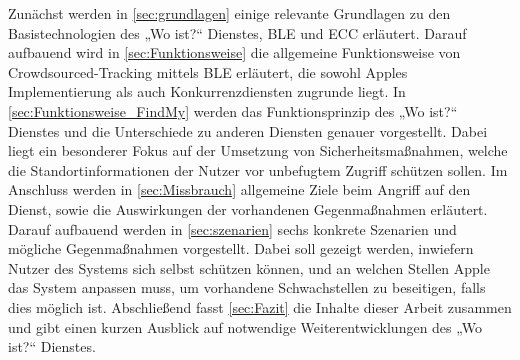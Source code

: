 Zunächst werden in \autoref{sec:grundlagen} einige relevante Grundlagen zu den Basistechnologien des „Wo ist?“ Dienstes, \ac{BLE} und \ac{ECC} erläutert.
Darauf aufbauend wird in \autoref{sec:Funktionsweise} die allgemeine Funktionsweise von Crowdsourced-Tracking mittels \ac{BLE} erläutert, die sowohl Apples Implementierung als auch Konkurrenzdiensten zugrunde liegt.
In \autoref{sec:Funktionsweise_FindMy} werden das Funktionsprinzip des „Wo ist?“ Dienstes und die Unterschiede zu anderen Diensten genauer vorgestellt.
Dabei liegt ein besonderer Fokus auf der Umsetzung von Sicherheitsmaßnahmen, welche die Standortinformationen der Nutzer vor unbefugtem Zugriff schützen sollen.
Im Anschluss werden in \autoref{sec:Missbrauch} allgemeine Ziele beim Angriff auf den Dienst, sowie die Auswirkungen der vorhandenen Gegenmaßnahmen erläutert.
Darauf aufbauend werden in \autoref{sec:szenarien} sechs konkrete Szenarien und mögliche Gegenmaßnahmen vorgestellt.
Dabei soll gezeigt werden, inwiefern Nutzer des Systems sich selbst schützen können, und an welchen Stellen Apple das System anpassen muss, um vorhandene Schwachstellen zu beseitigen, falls dies möglich ist.
Abschließend fasst \autoref{sec:Fazit} die Inhalte dieser Arbeit zusammen und gibt einen kurzen Ausblick auf notwendige Weiterentwicklungen des „Wo ist?“ Dienstes.